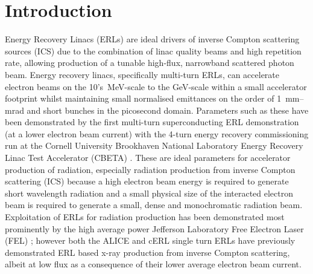 \documentclass[../main.tex]{subfiles}
\begin{document}
\chapter{Introduction}
\label{Introduction} %

Energy Recovery Linacs (ERLs) are ideal drivers of inverse Compton scattering sources (ICS) due to the combination of linac quality beams and high repetition rate, allowing production of a tunable high-flux, narrowband scattered photon beam. Energy recovery linacs, specifically multi-turn ERLs, can accelerate electron beams on the 10's~\si{\mega\electronvolt}-scale to the \si{\giga\electronvolt}-scale within a small accelerator footprint whilst maintaining small normalised emittances on the order of 1~\si{\milli\meter}--\si{\milli\radian} and short bunches in the picosecond domain. Parameters such as these have been demonstrated by the first multi-turn superconducting ERL demonstration (at a lower electron beam current) with the 4-turn energy recovery commissioning run at the Cornell University Brookhaven National Laboratory Energy Recovery Linac Test Accelerator (CBETA) \cite{hoffstaetter2017cbeta,bartnik2020cbeta}. These are ideal parameters for accelerator production of radiation, especially radiation production from inverse Compton scattering (ICS) because a high electron beam energy is required to generate short wavelength radiation and a small physical size of the interacted electron beam is required to generate a small, dense and monochromatic radiation beam. Exploitation of ERLs for radiation production has been demonstrated most prominently by the high average power Jefferson Laboratory Free Electron Laser (FEL) \cite{neil2006jlab}; however both the ALICE \cite{priebe2010first} and cERL \cite{akagi2016narrow} single turn ERLs have previously demonstrated ERL based x-ray production from inverse Compton scattering, albeit at low flux as a consequence of their lower average electron beam current. 
\end{document}
